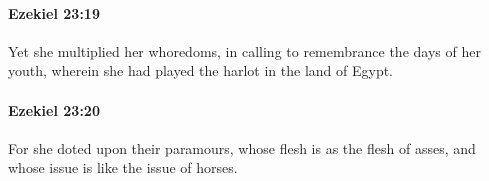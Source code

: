 		\paragraph{Ezekiel 23:19} %
			\label{EZEKIEL-23-19}

			Yet she multiplied her whoredoms, in calling to remembrance the days of her youth, wherein she had played the harlot in the land of Egypt.


		\paragraph{Ezekiel 23:20} %
			\label{EZEKIEL-23-20}

			For she doted upon their paramours, whose flesh is as the flesh of asses, and whose issue is like the issue of horses.


